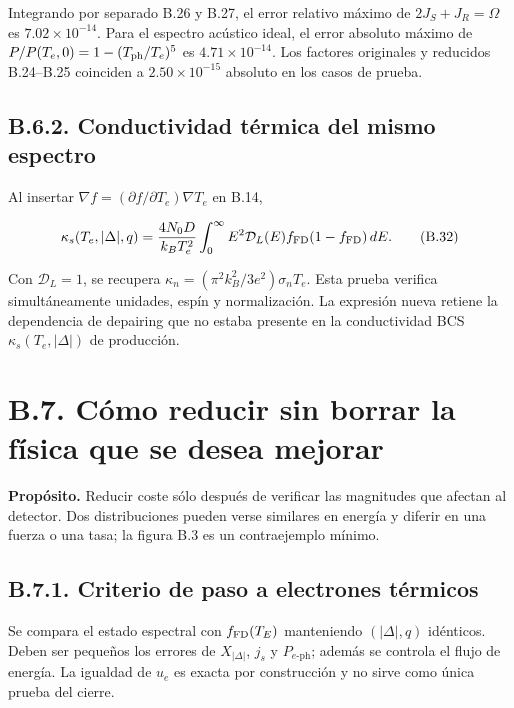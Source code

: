 \documentclass[
  spanish,
  10pt,
  a4paper,
]{article}
\begin{document}
Integrando por separado B.26 y B.27, el error relativo máximo de
\(2J_S+J_R=\Omega\) es \(7.02\times10^{-14}\). Para el espectro acústico
ideal, el error absoluto máximo de \(P/P(T_e,0)=1-(T_{\rm ph}/T_e)^5\)
es \(4.71\times10^{-14}\). Los factores originales y reducidos
B.24--B.25 coinciden a \(2.50\times10^{-15}\) absoluto en los casos de
prueba.

\subsection{B.6.2. Conductividad térmica del mismo
espectro}\label{b.6.2.-conductividad-tuxe9rmica-del-mismo-espectro}

Al insertar \(\nabla f=(\partial f/\partial T_e)\nabla T_e\) en B.14,

\[
\kappa_s(T_e,|\Delta|,q)=\frac{4N_0D}{k_BT_e^2}
\int_0^\infty E^2\mathcal D_L(E)
 f_{\rm FD}(1-f_{\rm FD})\,dE. \tag{B.32}
\]

Con \(\mathcal D_L=1\), se recupera
\(\kappa_n=(\pi^2k_B^2/3e^2)\sigma_nT_e\). Esta prueba verifica
simultáneamente unidades, espín y normalización. La expresión nueva
retiene la dependencia de depairing que no estaba presente en la
conductividad BCS \(\kappa_s(T_e,|\Delta|)\) de producción.

\section{B.7. Cómo reducir sin borrar la física que se desea
mejorar}\label{b.7.-cuxf3mo-reducir-sin-borrar-la-fuxedsica-que-se-desea-mejorar}

\textbf{Propósito.} Reducir coste sólo después de verificar las
magnitudes que afectan al detector. Dos distribuciones pueden verse
similares en energía y diferir en una fuerza o una tasa; la figura B.3
es un contraejemplo mínimo.

\subsection{B.7.1. Criterio de paso a electrones
térmicos}\label{b.7.1.-criterio-de-paso-a-electrones-tuxe9rmicos}

Se compara el estado espectral con \(f_{\rm FD}(T_E)\) manteniendo
\((|\Delta|,q)\) idénticos. Deben ser pequeños los errores de
\(X_{|\Delta|}\), \(j_s\) y \(P_{e\text{-ph}}\); además se controla el
flujo de energía. La igualdad de \(u_e\) es exacta por construcción y no
sirve como única prueba del cierre.
\end{document}
